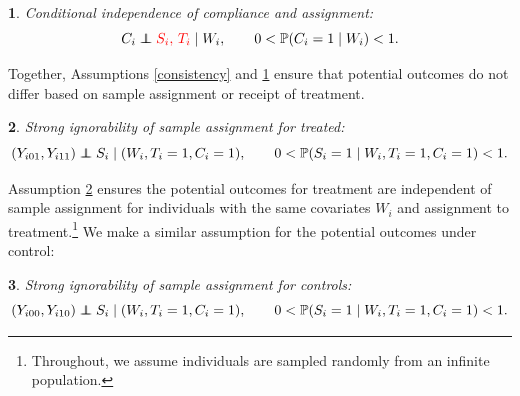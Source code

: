 \documentclass[hidelinks,12pt]{article}
\makeatletter
\newtheorem*{assumption*}{\assumptionnumber}
\providecommand{\assumptionnumber}{}
\newenvironment{assumption}[2]
 {%
  \renewcommand{\assumptionnumber}{Assumption #1}%
  \begin{assumption*}%
  \protected@edef\@currentlabel{#1}%
 }
 {%
  \end{assumption*}
 }
\newcommand{\pr}{\mathbb{P}} %
\newcommand\independent{\protect\mathpalette{\protect\independenT}{\perp}}
\def\independenT#1#2{\mathrel{\rlap{$#1#2$}\mkern2mu{#1#2}}}
\makeatother
\begin{document}
\vskip 0.2in
\begin{assumption}{2}{}\label{compl}
	Conditional independence of compliance and assignment:
	\begin{equation*}
	C_i \independent {\color{red}S_i,\,T_i} \mid W_i, \qquad 0 < \pr(C_i = 1 \mid W_i) < 1. 
	\end{equation*}
\end{assumption}

 Together, Assumptions \ref{consistency} and \ref{compl} ensure that potential outcomes do not differ based on sample assignment or receipt of treatment.

\vskip 0.2in
\begin{assumption}{3}{}\label{si_treat}
	Strong ignorability of sample assignment for treated:
	\begin{equation*}
		(Y_{i01}, Y_{i11}) \independent S_i \mid (W_i, T_i=1,C_i=1), \qquad 0 < \pr(S_i=1 \mid W_i, T_i=1,C_i=1) <1.
	\end{equation*}
\end{assumption}

\noindent Assumption \ref{si_treat} ensures the potential outcomes for treatment are independent of sample assignment for individuals with the same covariates $W_i$ and assignment to treatment.\footnote{Throughout, we assume individuals are sampled randomly from an infinite population.} We make a similar assumption for the potential outcomes under control: 

\vskip 0.2in
\begin{assumption}{4}{}\label{si_ctrl}
	Strong ignorability of sample assignment for controls:
	\begin{equation*}
		(Y_{i00}, Y_{i10}) \independent S_i \mid (W_i, T_i=1,C_i= 1), \qquad 0 < \pr(S_i=1 \mid W_i, T_i=1,C_i=1) <1. 
\end{equation*}\end{assumption}

\color{red}
\end{document}
